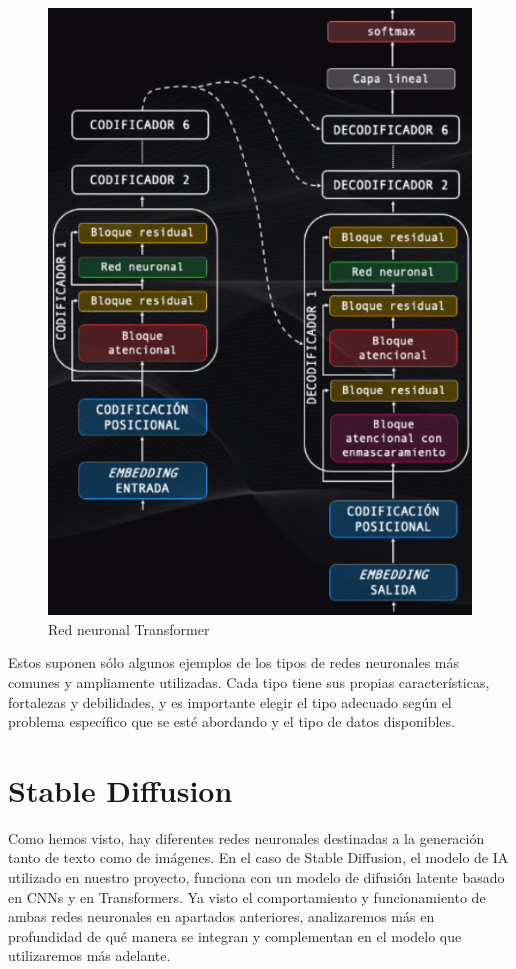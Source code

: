 \begin{figure}[h]
	\centering
	\includegraphics[width = 0.7 \textwidth]{Imagenes/Vectorial/transformer.png}
	\caption{Red neuronal Transformer \citep{transformers}}
	\label{fig:transformer}
\end{figure}

Estos suponen sólo algunos ejemplos de los tipos de redes neuronales más comunes y ampliamente utilizadas. Cada tipo tiene sus propias características, fortalezas y debilidades, y es importante elegir el tipo adecuado según el problema específico que se esté abordando y el tipo de datos disponibles.\\

 \section{Stable Diffusion}

Como hemos visto, hay diferentes redes neuronales destinadas a la generación tanto de texto como de imágenes. En el caso de Stable Diffusion, el modelo de IA utilizado en nuestro proyecto, funciona con un modelo de difusión latente basado en CNNs y en Transformers. Ya visto el comportamiento y funcionamiento de ambas redes neuronales en apartados anteriores, analizaremos más en profundidad de qué manera se integran y complementan en el modelo que utilizaremos más adelante.\\



